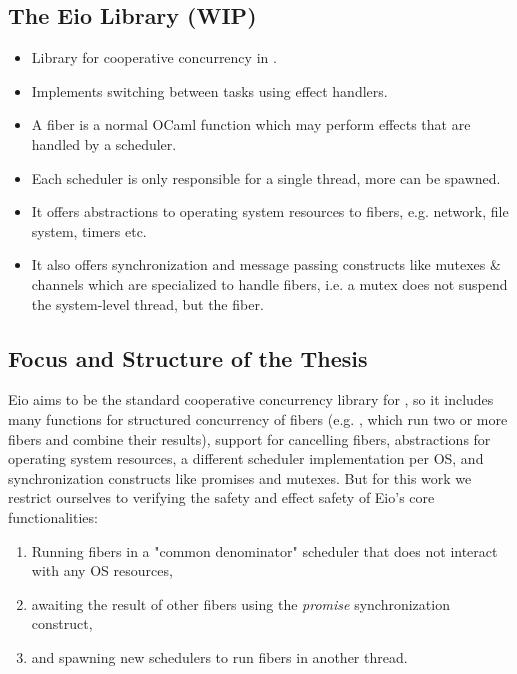 \subsection{The Eio Library (WIP)}
\label{sec:intro-eio}

\begin{itemize}
  \item Library for cooperative concurrency in \ocf{}.
  \item Implements switching between tasks using effect handlers.
  \item A fiber is a normal OCaml function which may perform effects that are handled by a scheduler.
  \item Each scheduler is only responsible for a single thread, more can be spawned.
  \item It offers abstractions to operating system resources to fibers, e.g. network, file system, timers etc.
  \item It also offers synchronization and message passing constructs like mutexes \& channels which are specialized to handle fibers, i.e. a mutex does not suspend the system-level thread, but the fiber.
\end{itemize}

\subsection{Focus and Structure of the Thesis}
\label{sec:intro-structure}

Eio aims to be the standard cooperative concurrency library for \ocf{}, so it includes many functions for structured concurrency of fibers (e.g. , which run two or more fibers and combine their results), support for cancelling fibers, abstractions for operating system resources, a different scheduler implementation per OS, and synchronization constructs like promises and mutexes.
But for this work we restrict ourselves to verifying the safety and effect safety of Eio's core functionalities:
\begin{enumerate}
  \item Running fibers in a "common denominator" scheduler that does not interact with any OS resources,
  \item awaiting the result of other fibers using the \textit{promise} synchronization construct,
  \item and spawning new schedulers to run fibers in another thread.
\end{enumerate}

